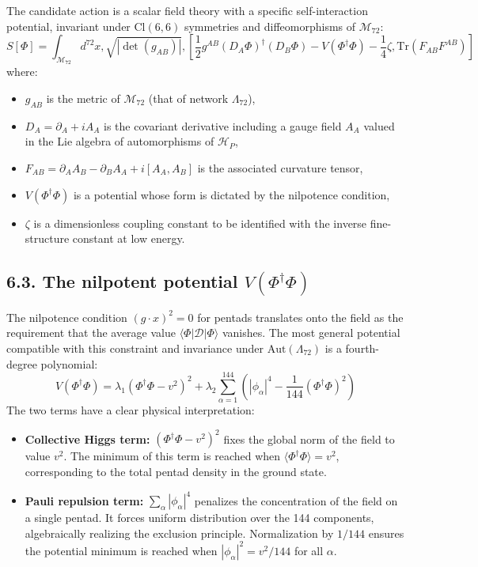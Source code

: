 \documentclass[11pt]{article}
\providecommand{\tightlist}{\setlength{\itemsep}{2pt}\setlength{\parskip}{6pt}}
\let\oldmathcal\mathcal
\renewcommand{\mathcal}[1]{\oldmathcal{#1}}
\providecommand{\tightlist}{%
  \setlength{\itemsep}{2pt}\setlength{\parskip}{6pt}
}
\begin{document}
The candidate action is a scalar field theory with a specific
self-interaction potential, invariant under \(\text{Cl}(6,6)\)
symmetries and diffeomorphisms of \(\mathcal{M}_{72}\): \[
\boxed{
S[\Phi] = \int_{\mathcal{M}_{72}} d^{72}x , \sqrt{|\det(g_{AB})|} , \left[ \frac{1}{2} g^{AB} (D_A \Phi)^\dagger (D_B \Phi) - V(\Phi^\dagger \Phi) - \frac{1}{4} \zeta , \text{Tr}(F_{AB} F^{AB}) \right]
}
\] where:

\begin{itemize}
\tightlist
\item
  \(g_{AB}\) is the metric of \(\mathcal{M}_{72}\) (that of network
  \(\Lambda_{72}\)),
\item
  \(D_A = \partial_A + i A_A\) is the covariant derivative including a
  gauge field \(A_A\) valued in the Lie algebra of automorphisms of
  \(\mathcal{H}_P\),
\item
  \(F_{AB} = \partial_A A_B - \partial_B A_A + i[A_A, A_B]\) is the
  associated curvature tensor,
\item
  \(V(\Phi^\dagger \Phi)\) is a potential whose form is dictated by the
  nilpotence condition,
\item
  \(\zeta\) is a dimensionless coupling constant to be identified with
  the inverse fine-structure constant at low energy.
\end{itemize}

\hypertarget{the-nilpotent-potential-vphidagger-phi}{%
\subsection{\texorpdfstring{6.3. The nilpotent potential
\(V(\Phi^\dagger \Phi)\)}{6.3. The nilpotent potential V(\textbackslash Phi\^{}\textbackslash dagger \textbackslash Phi)}}\label{the-nilpotent-potential-vphidagger-phi}}

The nilpotence condition \((g \cdot x)^2 = 0\) for pentads translates
onto the field as the requirement that the average value
\(\langle \Phi | \mathcal{D} | \Phi \rangle\) vanishes. The most general
potential compatible with this constraint and invariance under
\(\text{Aut}(\Lambda_{72})\) is a fourth-degree polynomial: \[
V(\Phi^\dagger \Phi) = \lambda_1 \left( \Phi^\dagger \Phi - v^2 \right)^2 + \lambda_2 \sum_{\alpha=1}^{144} \left( |\phi_\alpha|^4 - \frac{1}{144} (\Phi^\dagger \Phi)^2 \right)
\] The two terms have a clear physical interpretation:

\begin{itemize}
\tightlist
\item
  \textbf{Collective Higgs term:} \((\Phi^\dagger \Phi - v^2)^2\) fixes
  the global norm of the field to value \(v^2\). The minimum of this
  term is reached when \(\langle \Phi^\dagger \Phi \rangle = v^2\),
  corresponding to the total pentad density in the ground state.
\item
  \textbf{Pauli repulsion term:} \(\sum_\alpha |\phi_\alpha|^4\)
  penalizes the concentration of the field on a single pentad. It forces
  uniform distribution over the 144 components, algebraically realizing
  the exclusion principle. Normalization by \(1/144\) ensures the
  potential minimum is reached when \(|\phi_\alpha|^2 = v^2/144\) for
  all \(\alpha\).
\end{itemize}
\end{document}
